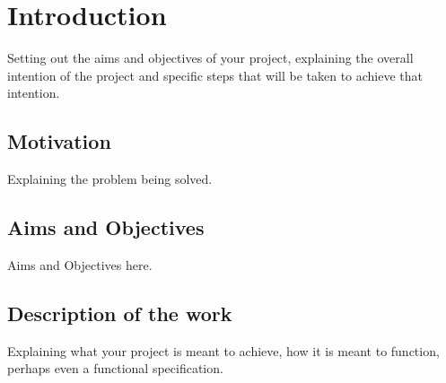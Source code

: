 \chapter{Introduction}

Setting out the aims and objectives of your project, explaining the overall intention of the project and specific steps that will be taken to achieve that intention.

\section{Motivation}

Explaining the problem being solved.


\section{Aims and Objectives}

Aims and Objectives here.


\section{Description of the work}

Explaining what your project is meant to achieve, how it is meant to function, perhaps even a functional specification.
